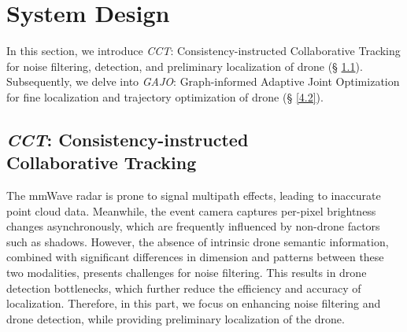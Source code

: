 \vspace{-0.3cm}
\section{System Design} \label{4}
In this section, we introduce \textit{CCT}: Consistency-instructed Collaborative Tracking for noise filtering, detection, and preliminary localization of drone (§ \ref{4.1}). 
Subsequently, we delve into \textit{GAJO}: Graph-informed Adaptive Joint Optimization for fine localization and trajectory optimization of drone (§ \ref{4.2}).

\vspace{-0.2cm}
\subsection{\textit{CCT}: Consistency-instructed \\ Collaborative Tracking} \label{4.1}

The mmWave radar is prone to signal multipath effects, leading to inaccurate point cloud data.
Meanwhile, the event camera captures per-pixel brightness changes asynchronously, which are frequently influenced by non-drone factors such as shadows.  
However, the absence of intrinsic drone semantic information, combined with significant differences in dimension and patterns between these two modalities, presents challenges for noise filtering. 
This results in drone detection bottlenecks, which further reduce the efficiency and accuracy of localization.
Therefore, in this part, we focus on enhancing noise filtering and drone detection, while providing preliminary localization of the drone.


